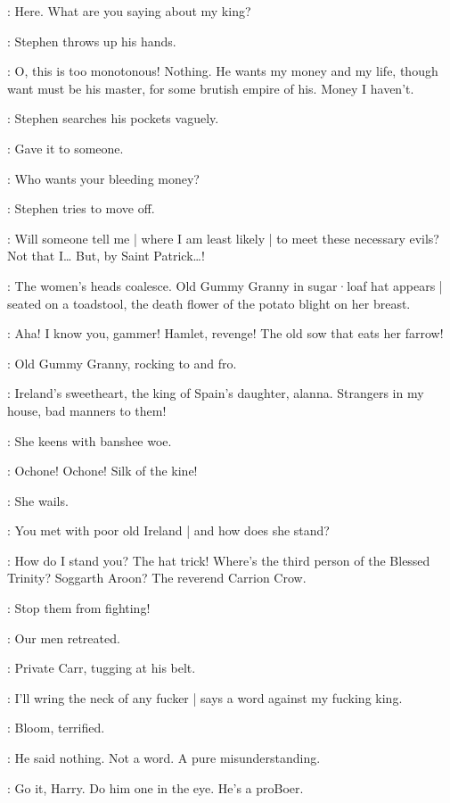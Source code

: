 \Carr[2]:
Here.
What are you saying about my king?

:
Stephen throws up his hands.

\Stephen:
O,
this is too monotonous!
Nothing.
He wants my money and my life,
though want must be his master,
for some brutish empire of his.
Money I haven't.

:
Stephen searches his pockets vaguely.

\Stephen:
Gave it to someone.

\Carr:
Who wants your bleeding money?

:
Stephen tries to move off.

\Stephen:
Will someone tell me |
where I am least likely |
to meet these necessary evils?
Not that I…
But,
by Saint Patrick…!

:
The women's heads coalesce.
Old Gummy Granny in sugar·loaf hat appears |
seated on a toadstool,
the death flower of the potato blight on her breast.%

\Stephen:
Aha!
I know you,
gammer!
Hamlet,
revenge!
The old sow that eats her farrow!

:
Old Gummy Granny,
rocking to and fro.

\GummyGranny:
Ireland's sweetheart,
the king of Spain's daughter,
alanna.
Strangers in my house,
bad manners to them!

:
She keens with banshee woe.

\GummyGranny:
Ochone!
Ochone!
Silk of the kine!

:
She wails.

\GummyGranny:
You met with poor old Ireland |
and how does she stand?

\Stephen:
How do I stand you?
%
The hat trick!
Where's the third person of the Blessed Trinity?
Soggarth Aroon?
The reverend Carrion Crow.

\Cissy[2]:
Stop them from fighting!

\ARough[1]:
Our men retreated.

:
Private Carr,
tugging at his belt.

\Carr:
I'll wring the neck of any fucker |
says a word against my fucking king.

:
Bloom,
terrified.

\Bloom:
He said nothing.
Not a word.
A pure misunderstanding.

\Compton[2]:
Go it,
Harry.
Do him one in the eye.
He's a proBoer.

